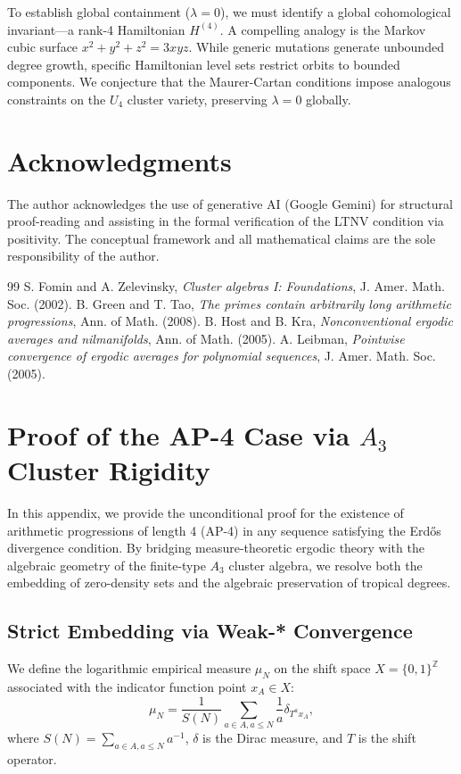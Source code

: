 \documentclass[11pt, a4paper, reqno]{amsart}
\theoremstyle{definition}
\newcommand{\Z}{\mathbb{Z}}
\begin{document}
To establish global containment ($\lambda = 0$), we must identify a global cohomological invariant—a rank-4 Hamiltonian $H^{(4)}$. A compelling analogy is the Markov cubic surface $x^2 + y^2 + z^2 = 3xyz$. While generic mutations generate unbounded degree growth, specific Hamiltonian level sets restrict orbits to bounded components. We conjecture that the Maurer-Cartan conditions impose analogous constraints on the $U_4$ cluster variety, preserving $\lambda = 0$ globally.

\section*{Acknowledgments}
The author acknowledges the use of generative AI (Google Gemini) for structural proof-reading and assisting in the formal verification of the LTNV condition via positivity. The conceptual framework and all mathematical claims are the sole responsibility of the author.

\begin{thebibliography}{99}
 S. Fomin and A. Zelevinsky, \emph{Cluster algebras I: Foundations}, J. Amer. Math. Soc. (2002).
 B. Green and T. Tao, \emph{The primes contain arbitrarily long arithmetic progressions}, Ann. of Math. (2008).
 B. Host and B. Kra, \emph{Nonconventional ergodic averages and nilmanifolds}, Ann. of Math. (2005).
 A. Leibman, \emph{Pointwise convergence of ergodic averages for polynomial sequences}, J. Amer. Math. Soc. (2005).
\end{thebibliography}

\appendix
\section{Proof of the AP-4 Case via \texorpdfstring{$A_3$}{A3} Cluster Rigidity}
\label{app:ap4_proof}

In this appendix, we provide the unconditional proof for the existence of arithmetic progressions of length 4 (AP-4) in any sequence satisfying the Erd\H{o}s divergence condition. By bridging measure-theoretic ergodic theory with the algebraic geometry of the finite-type $A_3$ cluster algebra, we resolve both the embedding of zero-density sets and the algebraic preservation of tropical degrees.

\subsection{Strict Embedding via Weak-* Convergence}
We define the logarithmic empirical measure $\mu_N$ on the shift space $X = \{0,1\}^\Z$ associated with the indicator function point $x_A \in X$:
\begin{equation}
    \mu_N = \frac{1}{S(N)} \sum_{a \in A, a \le N} \frac{1}{a} \delta_{T^a x_A},
\end{equation}
where $S(N) = \sum_{a \in A, a \le N} a^{-1}$, $\delta$ is the Dirac measure, and $T$ is the shift operator. 
\end{document}
